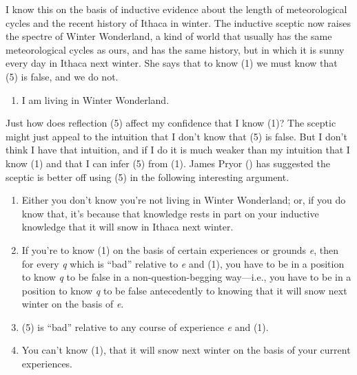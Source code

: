\documentclass[
  11pt,
  letterpaper,
  DIV=11,
  numbers=noendperiod,
  oneside]{scrartcl}
\providecommand{\tightlist}{%
  \setlength{\itemsep}{0pt}\setlength{\parskip}{0pt}}\usepackage{longtable,booktabs,array}
\begin{document}
I know this on the basis of inductive evidence about the length of
meteorological cycles and the recent history of Ithaca in winter. The
inductive sceptic now raises the spectre of Winter Wonderland, a kind of
world that usually has the same meteorological cycles as ours, and has
the same history, but in which it is sunny every day in Ithaca next
winter. She says that to know (1) we
must know that (5) is false, and we do not.

\begin{enumerate}
\def\labelenumi{\arabic{enumi}.}
\setcounter{enumi}{4}
\tightlist
\item
  I am living in Winter Wonderland.
\end{enumerate}

Just how does reflection (5) affect my confidence that I know (1)? The
sceptic might just appeal to the intuition that I don't know that (5) is
false. But I don't think I have that intuition, and if I do it is much
weaker than my intuition that I know (1) and that I can infer (5) from
(1). James Pryor () has suggested
the sceptic is better off using (5) in the following interesting
argument.

\begin{enumerate}
\def\labelenumi{\arabic{enumi}.}
\setcounter{enumi}{5}
\item
  Either you don't know you're not living in Winter Wonderland; or, if
  you do know that, it's because that knowledge rests in part on your
  inductive knowledge that it will snow in Ithaca next winter.
\item
  If you're to know (1) on the basis of certain experiences or grounds
  \emph{e}, then for every \emph{q} which is ``bad'' relative to
  \emph{e} and (1), you have to be in a position to know \emph{q} to be
  false in a non-question-begging way---i.e., you have to be in a
  position to know \emph{q} to be false antecedently to knowing that it
  will snow next winter on the basis of \emph{e}.
\item
  (5) is ``bad'' relative to any course of experience \emph{e} and (1).
\item
  You can't know (1), that it will snow next winter on the basis of your
  current experiences.
\end{enumerate}
\end{document}
